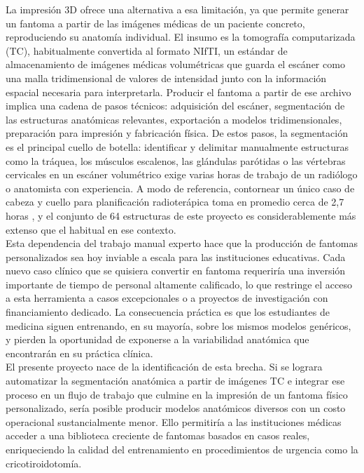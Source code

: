 La impresión 3D ofrece una alternativa a esa limitación, ya que permite generar un fantoma a partir de las imágenes médicas de un paciente concreto, reproduciendo su anatomía individual. El insumo es la tomografía computarizada (TC), habitualmente convertida al formato NIfTI, un estándar de almacenamiento de imágenes médicas volumétricas que guarda el escáner como una malla tridimensional de valores de intensidad junto con la información espacial necesaria para interpretarla. Producir el fantoma a partir de ese archivo implica una cadena de pasos técnicos: adquisición del escáner, segmentación de las estructuras anatómicas relevantes, exportación a modelos tridimensionales, preparación para impresión y fabricación física. De estos pasos, la segmentación es el principal cuello de botella: identificar y delimitar manualmente estructuras como la tráquea, los músculos escalenos, las glándulas parótidas o las vértebras cervicales en un escáner volumétrico exige varias horas de trabajo de un radiólogo o anatomista con experiencia. A modo de referencia, contornear un único caso de cabeza y cuello para planificación radioterápica toma en promedio cerca de 2,7 horas \citep{harari2010contouring}, y el conjunto de 64 estructuras de este proyecto es considerablemente más extenso que el habitual en ese contexto.\\

Esta dependencia del trabajo manual experto hace que la producción de fantomas personalizados sea hoy inviable a escala para las instituciones educativas. Cada nuevo caso clínico que se quisiera convertir en fantoma requeriría una inversión importante de tiempo de personal altamente calificado, lo que restringe el acceso a esta herramienta a casos excepcionales o a proyectos de investigación con financiamiento dedicado. La consecuencia práctica es que los estudiantes de medicina siguen entrenando, en su mayoría, sobre los mismos modelos genéricos, y pierden la oportunidad de exponerse a la variabilidad anatómica que encontrarán en su práctica clínica.\\

El presente proyecto nace de la identificación de esta brecha. Si se lograra automatizar la segmentación anatómica a partir de imágenes TC e integrar ese proceso en un flujo de trabajo que culmine en la impresión de un fantoma físico personalizado, sería posible producir modelos anatómicos diversos con un costo operacional sustancialmente menor. Ello permitiría a las instituciones médicas acceder a una biblioteca creciente de fantomas basados en casos reales, enriqueciendo la calidad del entrenamiento en procedimientos de urgencia como la cricotiroidotomía.\\

